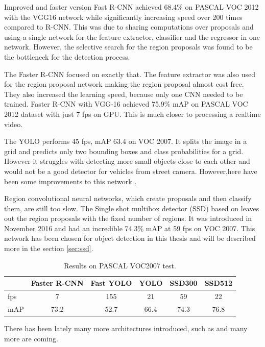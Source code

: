 \documentclass[a4paper,12pt,titlepage, twoside]{article}
\numberwithin{figure}{section}
\begin{document}
Improved and faster version Fast R-CNN \cite{girshick2015fast} achieved 68.4\% on PASCAL VOC 2012 with the VGG16 network while significantly increasing speed over 200 times compared to R-CNN. This was due to sharing computations over proposals and using a single network for the feature extractor, classifier and the regressor in one network. However, the selective search for the region proposals was found to be the bottleneck for the detection process.

The Faster R-CNN focused on exactly that. The feature extractor was also used for the region proposal network making the region proposal almost cost free. They also increased the learning speed, because only one CNN needed to be trained. Faster R-CNN with VGG-16 achieved 75.9\% mAP on PASCAL VOC 2012 dataset with just 7 fps on GPU. This is much closer to processing a realtime video.

The YOLO\cite{redmon2016you} performs 45 fps, mAP 63.4 on VOC 2007. It splits the image in a grid and predicts only two bounding boxes and class probabilities for a grid. However it struggles with detecting more small objects close to each other and would not be a good detector for vehicles from street camera. However,here have been some improvements to this network \cite{redmon2017yolo9000, redmon2018yolov3}.

Region convolutional neural networks, which create proposals and then classify them, are still too slow. The Single shot multibox detector (SSD) \cite{liu2016ssd} based on \cite{erhan2014scalable} leaves out the region proposals with the fixed number of regions. It was introduced in November 2016 and had an incredible 74.3\% mAP at 59 fps on VOC 2007. This network has been chosen for object detection in this thesis and will be described more in the section \ref{sec:ssd}. 

\begin{table}
\centering
\begin{tabular}{|l|c|c|c|c|c|}
  \hline
  &Faster R-CNN & Fast YOLO & YOLO & SSD300 & SSD512 \\
  \hline
  fps & 7 & 155 & 21 & 59 & 22\\
  \hline
  mAP & 73.2 & 52.7 & 66.4 & 74.3 & 76.8\\
  \hline
\end{tabular}
\caption{Results on PASCAL VOC2007 test.}
\end{table}

There has been lately many more architectures introduced, such as \cite{lin2017focal, li2017fssd, dai2016r} and many more are coming.
\end{document}
